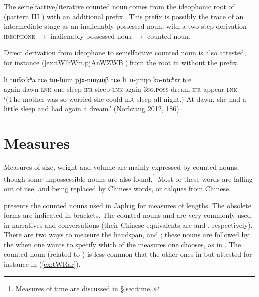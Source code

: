 The semelfactive/iterative counted noun  comes from the ideophonic root of  (pattern III ) with an additional prefix . This prefix is possibly the trace of an intermediate stage as an inalienably possessed noun, with a two-step derivation \textsc{ideophone} $\rightarrow$ inalienably possessed noun $\rightarrow$ counted noun.

Direct derivation from ideophone to semelfactive counted noun is also attested, for instance  (\ref{ex:tWlhWm.pjAnWZWB}) from the root in  without the  prefix.

\begin{exe}
\ex \label{ex:tWlhWm.pjAnWZWB} 
\gll li tɯfsɤkʰa tɕe tɯ-ɬɯm pjɤ-nɯʑɯβ tɕe li ɯ-jmŋo ko-ntɕʰɤr tɕe \\
again dawn \textsc{lnk} one-sleep \textsc{ifr}-sleep \textsc{lnk} again  \textsc{3sg}.\textsc{poss}-dream \textsc{ifr}-appear \textsc{lnk} \\
\glt `(The mother was so worried she could not sleep all night.) At dawn, she had a little sleep and had again a dream.' (Norbzang 2012, 186)
\end{exe}

\section{Measures} \label{sec:measures}
Measures of size, weight and volume are mainly expressed by counted nouns, though some unpossessible nouns are also found.\footnote{Measures of time are discussed in §\ref{sec:time}. } Most or these words are falling out of use, and being replaced by Chinese words, or calques from Chinese.

 presents the counted nouns used in Japhug for measures of lengths. The obsolete forms are indicated in brackets. The counted nouns  and  are very commonly used in narratives and conversations (their Chinese equivalents are   and   , respectively). There are two ways to measure the handspan,  and ; these nouns are followed by the  when one wants to specify which of the measures one chooses, as in . The counted noun  (related to ) is less common that the other ones in  but attested for instance in (\ref{ex:tWRar}).

